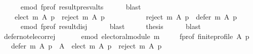 \begin{isabellebody}
\ \ \ \ \isamarkupfalse%
\ e{\isacharunderscore}{\kern0pt}mod\ f{\isacharunderscore}{\kern0pt}prof\ result{\isacharunderscore}{\kern0pt}presv{\isacharunderscore}{\kern0pt}alts\isanewline
\ \ \ \ \isamarkupfalse%
\ blast\isanewline
\ \ \isamarkupfalse%
\ \isamarkupfalse%
\ {}\ \isamarkupfalse%
\isanewline
\ \ \ \ {\isachardoublequoteopen}{\isacharparenleft}{\kern0pt}elect\ m\ A\ p{\isacharparenright}{\kern0pt}\ {\isasyminter}\ {\isacharparenleft}{\kern0pt}reject\ m\ A\ p{\isacharparenright}{\kern0pt}\ {\isacharequal}{\kern0pt}\ {\isacharbraceleft}{\kern0pt}{\isacharbraceright}{\kern0pt}\ {\isasymand}\isanewline
\ \ \ \ \ \ \ \ {\isacharparenleft}{\kern0pt}reject\ m\ A\ p{\isacharparenright}{\kern0pt}\ {\isasyminter}\ {\isacharparenleft}{\kern0pt}defer\ m\ A\ p{\isacharparenright}{\kern0pt}\ {\isacharequal}{\kern0pt}\ {\isacharbraceleft}{\kern0pt}{\isacharbraceright}{\kern0pt}{\isachardoublequoteclose}\isanewline
\ \ \ \ \isamarkupfalse%
\ e{\isacharunderscore}{\kern0pt}mod\ f{\isacharunderscore}{\kern0pt}prof\ result{\isacharunderscore}{\kern0pt}disj\isanewline
\ \ \ \ \isamarkupfalse%
\ blast\isanewline
\ \ \isamarkupfalse%
\ \isamarkupfalse%
\ {\isacharquery}{\kern0pt}thesis\isanewline
\ \ \ \ \isamarkupfalse%
\ blast\isanewline
{}\isamarkupfalse%
%
\endisatagproof
{\isafoldproof}%
%
\isadelimproof
\isanewline
%
\endisadelimproof
\isanewline
{}\isamarkupfalse%
\ defer{\isacharunderscore}{\kern0pt}not{\isacharunderscore}{\kern0pt}elec{\isacharunderscore}{\kern0pt}or{\isacharunderscore}{\kern0pt}rej{\isacharcolon}{\kern0pt}\isanewline
\ \ \isanewline
\ \ \ \ e{\isacharunderscore}{\kern0pt}mod{\isacharcolon}{\kern0pt}\ {\isachardoublequoteopen}electoral{\isacharunderscore}{\kern0pt}module\ m{\isachardoublequoteclose}\ \isanewline
\ \ \ \ f{\isacharunderscore}{\kern0pt}prof{\isacharcolon}{\kern0pt}\ {\isachardoublequoteopen}finite{\isacharunderscore}{\kern0pt}profile\ A\ p{\isachardoublequoteclose}\isanewline
\ \ \ {\isachardoublequoteopen}defer\ m\ A\ p\ {\isacharequal}{\kern0pt}\ A\ {\isacharminus}{\kern0pt}\ {\isacharparenleft}{\kern0pt}elect\ m\ A\ p{\isacharparenright}{\kern0pt}\ {\isacharminus}{\kern0pt}\ {\isacharparenleft}{\kern0pt}reject\ m\ A\ p{\isacharparenright}{\kern0pt}{\isachardoublequoteclose}\isanewline
%
\isadelimproof
%
\endisadelimproof
%
\isatagproof
{}\isamarkupfalse%

\end{isabellebody}
